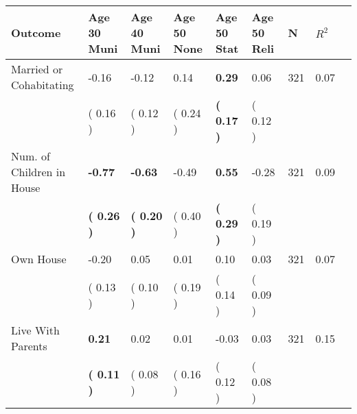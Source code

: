 \begin{tabular}{L{6.2cm} C{1.8cm} C{1.8cm} C{1.8cm} C{1.8cm} C{1.8cm} C{1.8cm} C{0.3cm} C{0.3cm}}
\toprule
 \textbf{Outcome} & \textbf{Age 30 Muni} & \textbf{Age 40 Muni} & \textbf{Age 50 None} & \textbf{Age 50 Stat} & \textbf{Age 50 Reli} & \textbf{N} & \textbf{$ R^2$} \\
\midrule
Married or Cohabitating &     -0.16 &     -0.12 &      0.14 & \textbf{     0.29} &      0.06  & 321 &       0.07 \\ 
 & (     0.16 ) & (     0.12 ) & (     0.24 ) & \textbf{(     0.17 )} & (     0.12 )  & \\
Num. of Children in House & \textbf{    -0.77} & \textbf{    -0.63} &     -0.49 & \textbf{     0.55} &     -0.28  & 321 &       0.09 \\ 
 & \textbf{(     0.26 )} & \textbf{(     0.20 )} & (     0.40 ) & \textbf{(     0.29 )} & (     0.19 )  & \\
Own House &     -0.20 &      0.05 &      0.01 &      0.10 &      0.03  & 321 &       0.07 \\ 
 & (     0.13 ) & (     0.10 ) & (     0.19 ) & (     0.14 ) & (     0.09 )  & \\
Live With Parents & \textbf{     0.21} &      0.02 &      0.01 &     -0.03 &      0.03  & 321 &       0.15 \\ 
 & \textbf{(     0.11 )} & (     0.08 ) & (     0.16 ) & (     0.12 ) & (     0.08 )  & \\
\bottomrule
\end{tabular}

